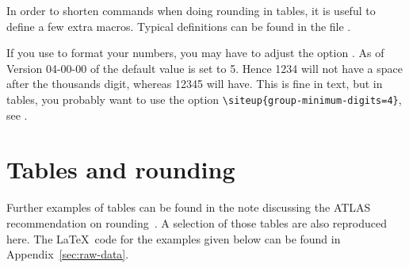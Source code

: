 \documentclass[UKenglish,texlive=2016]{\ATLASLATEXPATH atlasdoc}
\begin{document}
In order to shorten commands when doing rounding in tables, it is useful to define a few extra macros.
Typical definitions can be found in the file .

If you use  to format your numbers,
you may have to adjust the option .
As of Version 04-00-00 of  the default value is set to 5.
Hence \num{1234} will not have a space after the thousands digit,
whereas \num{12345} will have.
This is fine in text, but in tables, you probably want to use the option
\verb|\siteup{group-minimum-digits=4}|, see \Tabs{\ref{tab:minimum-digits1}}{\ref{tab:minimum-digits2}}.

\begin{table}[htbp]
  \centering
  \qquad
  \caption{Tables comparing different  values
  for the package .}
  \label{tab:minimum-digits}
\end{table}


\section{Tables and rounding}

Further examples of tables can be found in the note discussing the ATLAS recommendation on rounding~\cite{atlas-rounding}.
A selection of those tables are also reproduced here.
The \LaTeX\ code for the examples given below can be found in
Appendix~\ref{sec:raw-data}.
\end{document}
